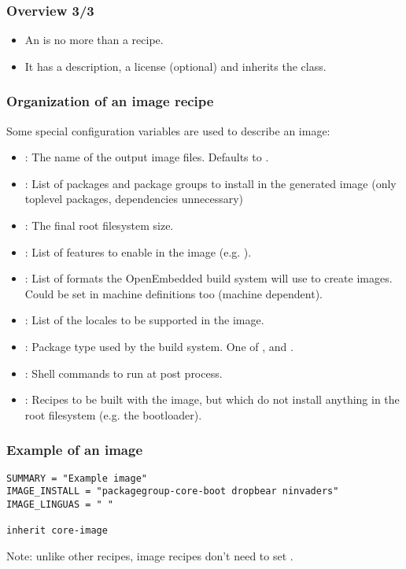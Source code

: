 \begin{frame}
  \frametitle{Overview 3/3}
  \begin{itemize}
    \item An  is no more than a recipe.
    \item It has a description, a license (optional) and inherits the
       class.
  \end{itemize}
\end{frame}

\begin{frame}
  \frametitle{Organization of an image recipe}
  Some special configuration variables are used to describe an image:
      \begin{itemize}
        \item {}: The name of the output image files.
          Defaults to .
        \item {}: List of packages and package groups to
          install in the generated image (only toplevel packages, dependencies unnecessary)
        \item {}: The final root filesystem size.
        \item {}: List of features to enable in the
          image (e.g. ).
        \item {}: List of formats the OpenEmbedded build
          system will use to create images. Could be set in machine
          definitions too (machine dependent).
        \item {}: List of the locales to be supported in
          the image.
        \item {}: Package type used by the build system.
          One of ,  and .
        \item {}: Shell commands to run at
          post process.
        \item {}: Recipes to be built with the image, but
          which do not install anything in the root filesystem
          (e.g. the bootloader).
      \end{itemize}
\end{frame}

\begin{frame}[fragile]
  \frametitle{Example of an image}
  \begin{block}{}
    \begin{verbatim}
SUMMARY = "Example image"
IMAGE_INSTALL = "packagegroup-core-boot dropbear ninvaders"
IMAGE_LINGUAS = " "

inherit core-image
    \end{verbatim}
  \end{block}
  Note: unlike other recipes, image recipes don't need to set
  .
\end{frame}

